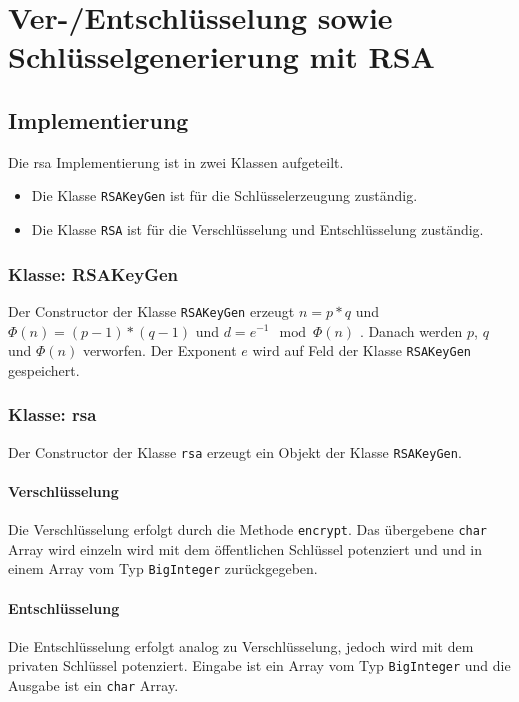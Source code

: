 \chapter{Ver-/Entschlüsselung sowie Schlüsselgenerierung mit RSA}

\section{Implementierung}
Die \gls{rsa} Implementierung ist in zwei Klassen aufgeteilt.
\begin{itemize}
	\item Die Klasse \texttt{RSAKeyGen} ist für die Schlüsselerzeugung zuständig.
	\item Die Klasse \texttt{RSA} ist für die Verschlüsselung und Entschlüsselung zuständig.
\end{itemize}

\subsection{Klasse: RSAKeyGen}
Der Constructor der Klasse \texttt{RSAKeyGen} erzeugt $n = p*q$ und $\Phi(n) = (p-1)*(q-1)$ und $d = e^{-1} \mod \Phi(n)$ \cite{rfc8017}. Danach werden $p$, $q$ und $\Phi(n)$ verworfen. Der Exponent $e$ wird auf Feld der Klasse \texttt{RSAKeyGen} gespeichert.

\subsection{Klasse: \gls{rsa}}
Der Constructor der Klasse \texttt{\gls{rsa}} erzeugt ein Objekt der Klasse \texttt{RSAKeyGen}.

\subsubsection{Verschlüsselung}
Die Verschlüsselung erfolgt durch die Methode \texttt{encrypt}. Das übergebene \texttt{char} Array wird einzeln wird mit dem öffentlichen Schlüssel potenziert \cite{rfc8017} und und in einem Array vom Typ \texttt{BigInteger} zurückgegeben.

\subsubsection{Entschlüsselung}
Die Entschlüsselung erfolgt analog zu Verschlüsselung, jedoch wird mit dem privaten Schlüssel potenziert. Eingabe ist ein Array vom Typ \texttt{BigInteger} und die Ausgabe ist ein \texttt{char} Array.

